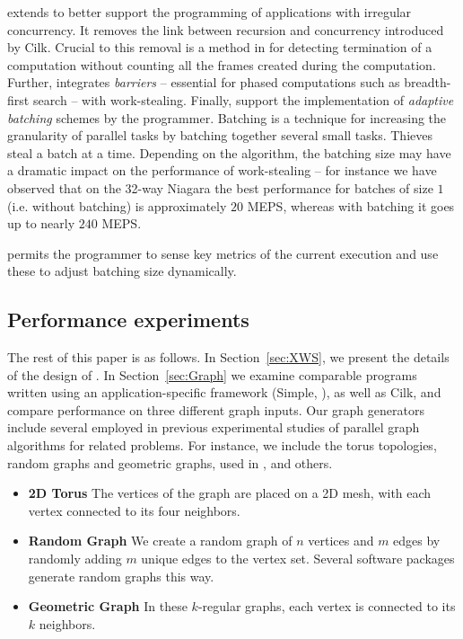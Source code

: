 \XWS{} extends \CWS{} to better support the programming of
applications with irregular concurrency. It removes the link between
recursion and concurrency introduced by Cilk. Crucial to this removal
is a method in \XWS{} for detecting termination of a computation
without counting all the frames created during the computation.
Further, \XWS{} integrates {\em barriers} -- essential for phased
computations such as breadth-first search -- with
work-stealing. Finally, \XWS{} support the implementation of {\em
adaptive batching} schemes by the programmer. Batching is a technique
for increasing the granularity of parallel tasks by batching together
several small tasks. Thieves steal a batch at a time. Depending on the
algorithm, the batching size may have a dramatic impact on the
performance of work-stealing -- for instance we have observed that on
the 32-way Niagara the best performance for batches of size $1$
(i.e.{} without batching) is approximately $20$ MEPS, whereas with
batching it goes up to nearly $240$ MEPS.

\XWS{} permits the programmer to sense key metrics of the current
execution and use these to adjust batching size dynamically.


\subsection{Performance experiments}

The rest of this paper is as follows. In Section~\ref{sec:XWS}, we
present the details of the design of \XWS. In Section~\ref{sec:Graph}
we examine comparable programs written using an application-specific
framework (Simple, \cite{BC04a}), as well as Cilk, and compare
performance on three different graph inputs.  Our graph generators
include several employed in previous experimental studies of parallel
graph algorithms for related problems. For instance, we include the
torus topologies, random graphs and geometric graphs, used in \cite{Gre94}, \cite{HRD97} and others.

\begin{itemize}
\itemsep0pt
\item \textbf{2D Torus} The vertices of the graph are placed on a 2D
  mesh, with each vertex connected to its four neighbors.  

\item \textbf{Random Graph} We create a random graph of $n$ vertices
  and $m$ edges by randomly adding $m$ unique edges to the vertex
  set. Several software packages generate random graphs this way.
  
\item \textbf{Geometric Graph} In these $k$-regular graphs,
  each vertex is connected to its $k$ %
  neighbors.  
\end{itemize}

